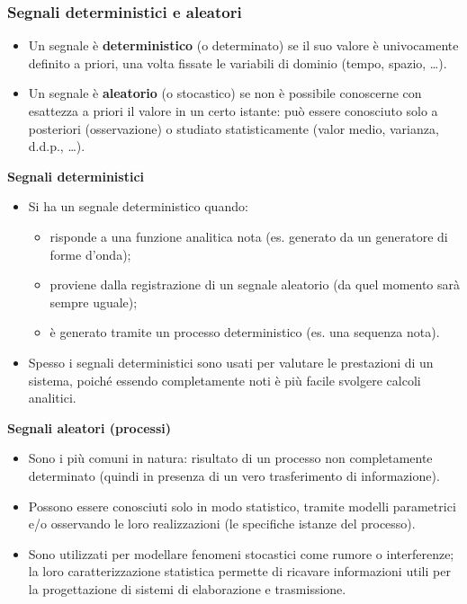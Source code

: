 \documentclass[12pt, a4paper]{article}
\begin{document}
\subsubsection{Segnali deterministici e aleatori}
\begin{itemize}
    \item Un segnale è \textbf{deterministico} (o determinato) se il suo valore è univocamente definito a priori, una volta fissate le variabili di dominio (tempo, spazio, \dots).
    \item Un segnale è \textbf{aleatorio} (o stocastico) se non è possibile conoscerne con esattezza a priori il valore in un certo istante: può essere conosciuto solo a posteriori (osservazione) o studiato statisticamente (valor medio, varianza, d.d.p., \dots).
\end{itemize}

\textbf{Segnali deterministici}
\begin{itemize}
    \item Si ha un segnale deterministico quando:
    \begin{itemize}
        \item risponde a una funzione analitica nota (es. generato da un generatore di forme d'onda);
        \item proviene dalla registrazione di un segnale aleatorio (da quel momento sarà sempre uguale);
        \item è generato tramite un processo deterministico (es. una sequenza nota).
    \end{itemize}
    \item Spesso i segnali deterministici sono usati per valutare le prestazioni di un sistema, poiché essendo completamente noti è più facile svolgere calcoli analitici.
\end{itemize}

\textbf{Segnali aleatori (processi)}
\begin{itemize}
    \item Sono i più comuni in natura: risultato di un processo non completamente determinato (quindi in presenza di un vero trasferimento di informazione).
    \item Possono essere conosciuti solo in modo statistico, tramite modelli parametrici e/o osservando le loro realizzazioni (le specifiche istanze del processo).
    \item Sono utilizzati per modellare fenomeni stocastici come rumore o interferenze; la loro caratterizzazione statistica permette di ricavare informazioni utili per la progettazione di sistemi di elaborazione e trasmissione.
\end{itemize}
\end{document}

